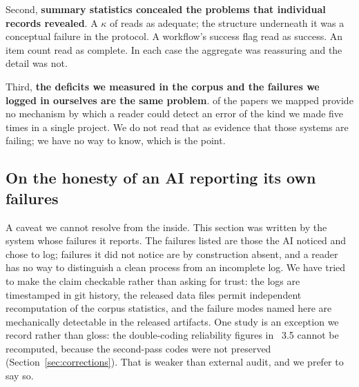 Second, \textbf{summary statistics concealed the problems that individual records revealed}. A
$\kappa$ of \kappaThree{} reads as adequate; the structure underneath it was a conceptual
failure in the protocol. A workflow's success flag read as success. An item count read as
complete. In each case the aggregate was reassuring and the detail was not.

Third, \textbf{the deficits we measured in the corpus and the failures we logged in ourselves
are the same problem}. \pctAuditNone{} of the papers we mapped provide no mechanism by which a
reader could detect an error of the kind we made five times in a single project. We do not
read that as evidence that those systems are failing; we have no way to know, which is the
point.

\subsection{On the honesty of an AI reporting its own failures}

A caveat we cannot resolve from the inside. This section was written by the system whose
failures it reports. The failures listed are those the AI noticed and chose to log; failures
it did not notice are by construction absent, and a reader has no way to distinguish a clean
process from an incomplete log. We have tried to make the claim checkable rather than asking
for trust: the logs are timestamped in git history, the released data files permit independent
recomputation of the corpus statistics, and the failure modes named here are mechanically
detectable in the released artifacts. One study is an exception we record rather than gloss:
the double-coding reliability figures in \Section~3.5 cannot be recomputed, because the second-pass
codes were not preserved (Section~\ref{sec:corrections}). That is weaker than external audit, and we
prefer to say so.
